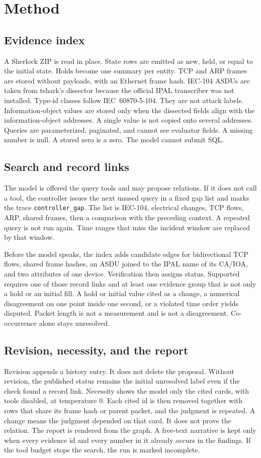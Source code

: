 \documentclass[conference]{IEEEtran}
\begin{document}
\section{Method}
\subsection{Evidence index}
A Sherlock ZIP is read in place.
State rows are emitted as new, held, or equal to the initial state.
Holds become one summary per entity.
TCP and ARP frames are stored without payloads, with an Ethernet frame hash.
IEC-104 ASDUs are taken from tshark's dissector because the official IPAL transcriber was not installed.
Type-id classes follow IEC~60870-5-104.
They are not attack labels.
Information-object values are stored only when the dissected fields align with the information-object addresses.
A single value is not copied onto several addresses.
Queries are parameterized, paginated, and cannot see evaluator fields.
A missing number is null.
A stored zero is a zero.
The model cannot submit SQL.

\subsection{Search and record links}
The model is offered the query tools and may propose relations.
If it does not call a tool, the controller issues the next unused query in a fixed gap list and marks the trace \texttt{controller\_gap}.
The list is IEC-104, electrical changes, TCP flows, ARP, shared frames, then a comparison with the preceding context.
A repeated query is not run again.
Time ranges that miss the incident window are replaced by that window.

Before the model speaks, the index adds candidate edges for bidirectional TCP flows, shared frame hashes, an ASDU joined to the IPAL name of its CA/IOA, and two attributes of one device.
Verification then assigns status.
Supported requires one of those record links and at least one evidence group that is not only a hold or an initial fill.
A hold or initial value cited as a change, a numerical disagreement on one point inside one second, or a violated time order yields disputed.
Packet length is not a measurement and is not a disagreement.
Co-occurrence alone stays unresolved.

\subsection{Revision, necessity, and the report}
Revision appends a history entry.
It does not delete the proposal.
Without revision, the published status remains the initial unresolved label even if the check found a record link.
Necessity shows the model only the cited cards, with tools disabled, at temperature 0.
Each cited id is then removed together with rows that share its frame hash or parent packet, and the judgment is repeated.
A change means the judgment depended on that card.
It does not prove the relation.
The report is rendered from the graph.
A free-text narrative is kept only when every evidence id and every number in it already occurs in the findings.
If the tool budget stops the search, the run is marked incomplete.
\end{document}
